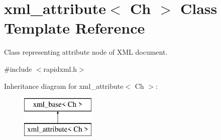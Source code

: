 \hypertarget{classrapidxml_1_1xml__attribute}{}\section{xml\+\_\+attribute$<$ Ch $>$ Class Template Reference}
\label{classrapidxml_1_1xml__attribute}


Class representing attribute node of X\+ML document.  




{\ttfamily \#include $<$rapidxml.\+h$>$}

Inheritance diagram for xml\+\_\+attribute$<$ Ch $>$\+:\begin{figure}[H]
\begin{center}
\leavevmode
\includegraphics[height=2.000000cm]{classrapidxml_1_1xml__attribute}
\end{center}
\end{figure}
